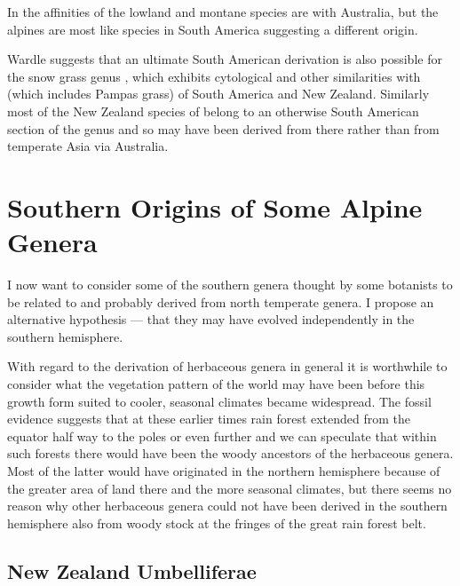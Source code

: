 In  the affinities of the lowland and montane species are with Australia, but the alpines are most like species in South America suggesting a different origin.

Wardle suggests that an ultimate South American derivation is also possible for the snow grass genus , which exhibits cytological and other similarities with  (which includes Pampas grass) of South America and New Zealand.
Similarly most of the New Zealand species of  belong to an otherwise South American section of the genus and so may have been derived from there rather than from temperate Asia via Australia.

\section{Southern Origins of Some Alpine Genera}

I now want to consider some of the southern genera thought by some botanists to be related to and probably derived from north temperate genera.
I propose an alternative hypothesis --- that they may have evolved independently in the southern hemisphere.

With regard to the derivation of herbaceous genera in general it is worthwhile to consider what the vegetation pattern of the world may have been before this growth form suited to cooler, seasonal climates became widespread.
The fossil evidence suggests that at these earlier times rain forest extended from the equator half way to the poles or even further and we can speculate that within such forests there would have been the woody ancestors of the herbaceous genera.
Most of the latter would have originated in the northern hemisphere because of the greater area of land there and the more seasonal climates, but there seems no reason why other herbaceous genera could not have been derived in the southern hemisphere also from woody stock at the fringes of the great rain forest belt.

\subsection{New Zealand Umbelliferae}

